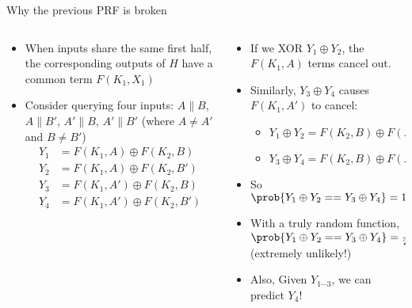 \documentclass[aspectratio=169, lualatex, handout]{beamer}
\begin{document}
\begin{frame}{Why the previous PRF is broken}
	\begin{columns}[c]
		\begin{column}{0.5\textwidth}
			\begin{itemize}[<+->]
				\item When inputs share the same first half, the corresponding outputs of $H$ have a common term $F(K_1, X_1)$
				\item Consider querying four inputs: $A\|B$, $A\|B'$, $A'\|B$, $A'\|B'$ (where $A \neq A'$ and $B \neq B'$)
				      \begin{align*}
					      Y_1 & = F(K_1, A) \oplus F(K_2, B)   \\
					      Y_2 & = F(K_1, A) \oplus F(K_2, B')  \\
					      Y_3 & = F(K_1, A') \oplus F(K_2, B)  \\
					      Y_4 & = F(K_1, A') \oplus F(K_2, B')
				      \end{align*}
			\end{itemize}
		\end{column}
		\begin{column}{0.5\textwidth}
			\begin{itemize}[<+->]
				\item If we XOR $Y_1 \oplus Y_2$, the $F(K_1, A)$ terms cancel out.
				\item Similarly, $Y_3 \oplus Y_4$ causes $F(K_1, A')$ to cancel:
				      \begin{itemize}
					      \item $Y_1 \oplus Y_2 = F(K_2, B) \oplus F(K_2, B')$
					      \item $Y_3 \oplus Y_4 = F(K_2, B) \oplus F(K_2, B')$
				      \end{itemize}
				\item So $\prob{Y_1 \oplus Y_2 == Y_3 \oplus Y_4} = 1$
				\item With a truly random function, $\prob{Y_1 \oplus Y_2 == Y_3 \oplus Y_4} = \frac{1}{2^m}$ (extremely unlikely!)
				\item Also, Given $Y_{1\cdots3}$, we can predict $Y_4$!
			\end{itemize}
		\end{column}
	\end{columns}
\end{frame}
\end{document}
